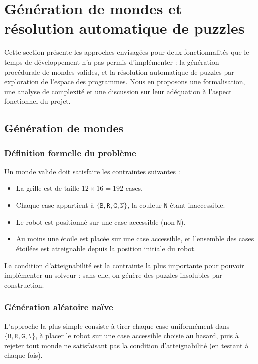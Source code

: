 \section{Génération de mondes et résolution automatique de puzzles}

Cette section présente les approches envisagées pour deux fonctionnalités que le temps de développement n'a pas permis d'implémenter : la génération procédurale de mondes valides, et la résolution automatique de puzzles par exploration de l'espace des programmes. Nous en proposons une formalisation, une analyse de complexité et une discussion sur leur adéquation à l'aspect fonctionnel du projet.

\subsection{Génération de mondes}

\subsubsection*{Définition formelle du problème}

Un monde valide doit satisfaire les contraintes suivantes :
\begin{itemize}
  \item La grille est de taille $12 \times 16 = 192$ cases.
  \item Chaque case appartient à $\{\texttt{B}, \texttt{R}, \texttt{G}, \texttt{N}\}$, la couleur \texttt{N} étant inaccessible.
  \item Le robot est positionné sur une case accessible (non \texttt{N}).
  \item Au moins une étoile est placée sur une case accessible, et l'ensemble des cases étoilées est atteignable depuis la position initiale du robot.
\end{itemize}

La condition d'atteignabilité est la contrainte la plus importante pour pouvoir implémenter un solveur : sans elle, on génère des puzzles insolubles par construction.

\subsubsection*{Génération aléatoire naïve}

L'approche la plus simple consiste à tirer chaque case uniformément dans $\{\texttt{B}, \texttt{R}, \texttt{G}, \texttt{N}\}$, à placer le robot sur une case accessible choisie au hasard, puis à rejeter tout monde ne satisfaisant pas la condition d'atteignabilité (en testant à chaque fois).

